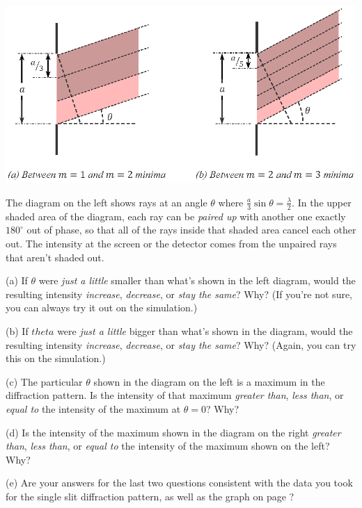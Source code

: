 {\centering \includegraphics{diffraction_of_light/diffraction_maxima_color.eps} \par}

The diagram on the left shows rays at an angle $\theta$ where $\frac{a}{3} \sin \theta = \frac{\lambda}{2}$.  In the upper shaded area of the diagram, each ray can be \textit{paired up} with another one exactly $180^{\circ}$ out of phase, so that all of the rays inside that shaded area cancel each other out.  The intensity at the screen or the detector  comes from the unpaired rays that aren't shaded out.

(a) If $\theta$ were \textit{just a little} smaller than what's shown in the left diagram, would the resulting intensity \textit{increase}, \textit{decrease}, or \textit{stay the same}?  Why?  (If you're not sure, you can always try it out on the simulation.)
\answerspace{0.4in}

(b) If $theta$ were \textit{just a little} bigger than what's shown in the diagram, would the resulting intensity \textit{increase}, \textit{decrease}, or \textit{stay the same}?  Why?  (Again, you can try this on the simulation.)
\answerspace{0.4in}

(c) The particular $\theta$ shown in the diagram on the left is a maximum in the diffraction pattern.  Is the intensity of that maximum \textit{greater than}, \textit{less than}, or \textit{equal to} the intensity of the maximum at $\theta = 0$?  Why?
\answerspace{0.4in}

\pagebreak[2]
(d) Is the intensity of the maximum shown in the diagram on the right \textit{greater than}, \textit{less than}, or \textit{equal to} the intensity of the maximum shown on the left?  Why?  
\answerspace{0.4in}

(e) Are your answers for the last two questions consistent with the data you took for the single slit diffraction pattern, as well as the graph on page \pageref{fraunhofer_graph}?
\answerspace{0.4in}


